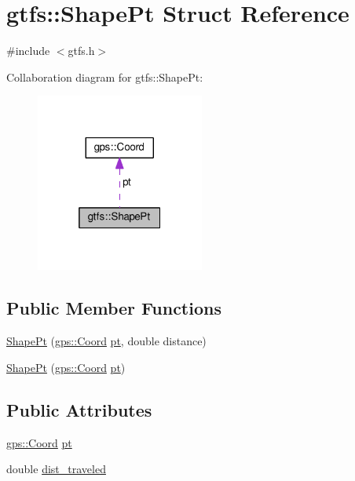 \hypertarget{structgtfs_1_1ShapePt}{}\section{gtfs\+:\+:Shape\+Pt Struct Reference}
\label{structgtfs_1_1ShapePt}


{\ttfamily \#include $<$gtfs.\+h$>$}



Collaboration diagram for gtfs\+:\+:Shape\+Pt\+:\nopagebreak
\begin{figure}[H]
\begin{center}
\leavevmode
\includegraphics[width=157pt]{structgtfs_1_1ShapePt__coll__graph}
\end{center}
\end{figure}
\subsection*{Public Member Functions}
\begin{DoxyCompactItemize}
\item 
\hyperlink{structgtfs_1_1ShapePt_a34e7da183770e2ab8360e286596ff18a}{Shape\+Pt} (\hyperlink{classgps_1_1Coord}{gps\+::\+Coord} \hyperlink{structgtfs_1_1ShapePt_ab79eb8263213afd27be9b257fca8515a}{pt}, double distance)
\item 
\hyperlink{structgtfs_1_1ShapePt_a44b97d5fba5a7f1d0c7988dbe8748f85}{Shape\+Pt} (\hyperlink{classgps_1_1Coord}{gps\+::\+Coord} \hyperlink{structgtfs_1_1ShapePt_ab79eb8263213afd27be9b257fca8515a}{pt})
\end{DoxyCompactItemize}
\subsection*{Public Attributes}
\begin{DoxyCompactItemize}
\item 
\hyperlink{classgps_1_1Coord}{gps\+::\+Coord} \hyperlink{structgtfs_1_1ShapePt_ab79eb8263213afd27be9b257fca8515a}{pt}
\item 
double \hyperlink{structgtfs_1_1ShapePt_acb29ef40a33bee6b4000c31731e25073}{dist\+\_\+traveled}
\end{DoxyCompactItemize}


